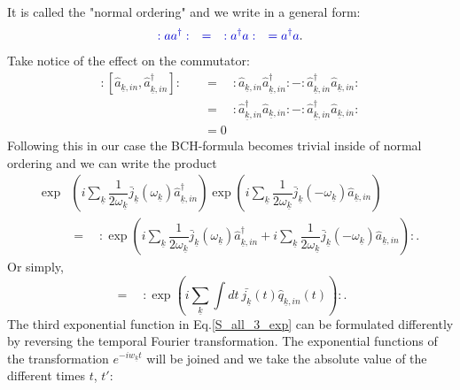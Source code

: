 \documentclass[12pt, titlepage]{article}
\begin{document}
It is called the "normal ordering" and we write in a general form:
\begin{equation}
\textcolor[RGB]{0,0,204}{
: a a^{\dagger} : 
\quad
=\quad
: a^{\dagger} a :
\quad
=
a^{\dagger} a
}.
\end{equation}
Take notice of the effect on the commutator:
\begin{equation}
\begin{split}
: \left[
\hat{a}_{\underline{k},in}
,
\hat{a}^{\dagger}_{\underline{k},in}
 \right] : 
 \quad
 &=
 \quad
 : 
\hat{a}_{\underline{k},in}
\hat{a}^{\dagger}_{\underline{k},in}
:
-
:
\hat{a}^{\dagger}_{\underline{k},in}
\hat{a}_{\underline{k},in}
  : 
  \\
  &=
 \quad
 : 
\hat{a}^{\dagger}_{\underline{k},in}
\hat{a}_{\underline{k},in}
:
-
:
\hat{a}^{\dagger}_{\underline{k},in}
\hat{a}_{\underline{k},in}
  : 
   \\
 &=0
 \end{split}
\end{equation}
Following this in our case the BCH-formula becomes trivial inside of normal ordering and we can write the product
\begin{equation}
\begin{split}
\exp &
    \left(
       i
    \sum_{\underline{k}}
     	\dfrac{1}{2\omega_{\underline{k}}}
     	 \bar{j}_{\underline{k}}(\omega_{\underline{k}})
			\hat{a}^{\dagger}_{\underline{k},in}     
    \right)    
        \exp
    \left(
     	  i
    	\sum_{\underline{k}}
     	\dfrac{1}{2\omega_{\underline{k}}}
      \bar{j}_{\underline{k}}(-\omega_{\underline{k}})
			\hat{a}_{\underline{k},in}  		
    \right)
	\\   
    &=
	\quad
	:
	\exp
    \left(
       i
    \sum_{\underline{k}}
     	\dfrac{1}{2\omega_{\underline{k}}}
     	 \bar{j}_{\underline{k}}(\omega_{\underline{k}})
			\hat{a}^{\dagger}_{\underline{k},in}     
		+
     	  i
    	\sum_{\underline{k}}
     	\dfrac{1}{2\omega_{\underline{k}}}
      \bar{j}_{\underline{k}}(-\omega_{\underline{k}})
			\hat{a}_{\underline{k},in}  		
    \right)
	:    
    .
\end{split}
\end{equation}
Or simply,
\begin{equation}\label{1_term_wick}
=
\quad
:
\exp
    \left(
    i
    \sum_{\underline{k}}\int dt \ \bar{j_{\underline{k}}}(t) \hat{q}_{\underline{k},in}(t) 
    \right)
    :  
    .
\end{equation}
The third exponential function in Eq.\enskip\eqref{S_all_3_exp} can be formulated differently by reversing the temporal Fourier transformation. The exponential functions of the transformation $ e^{-iw_{\underline{k}}t} $ will be joined and we take the absolute value of the different times $ t $, $ t' $:
\end{document}

